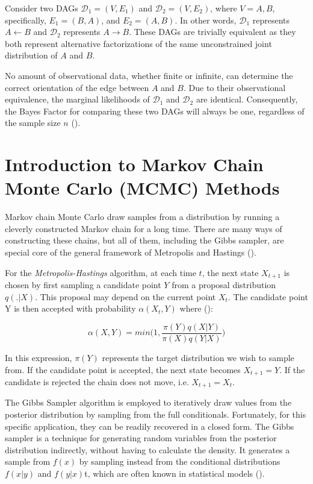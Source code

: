 \documentclass{report}
\begin{document}
Consider two DAGs $\mathcal{D}_1 = (V,E_1)$ and $\mathcal{D}_2 = (V,E_2)$, where $V = {A, B}$, specifically, $E_1 = {(B,A)}$, and $E_2 = {(A,B)}$. In other words, $\mathcal{D}_1$ represents $A \leftarrow B$ and $\mathcal{D}_2$ represents $A \rightarrow B$. These DAGs are trivially equivalent as they both represent alternative factorizations of the same unconstrained joint distribution of $A$ and $B$.

No amount of observational data, whether finite or infinite, can determine the correct orientation of the edge between $A$ and $B$. Due to their observational equivalence, the marginal likelihoods of $\mathcal{D}_1$ and $\mathcal{D}_2$ are identical. Consequently, the Bayes Factor for comparing these two DAGs will always be one, regardless of the sample size $n$ (\citet{peluso2020compatible}).

\section{Introduction to Markov Chain Monte Carlo (MCMC) Methods}

Markov chain Monte Carlo draw samples from a distribution by running a cleverly constructed Markov chain for a long time. There are many ways of constructing these chains, but all of them, including the Gibbs sampler, are special core of the general framework of Metropolis and Hastings (\citet{gilks1995introducing}). 

For the \textit{Metropolis-Hastings} algorithm, at each time $t$, the next state $X_{t+1}$ is chosen by first sampling a candidate point $Y$ from a proposal distribution $q(.|X)$. This proposal may depend on the current point $X_t$. The candidate point Y is then accepted with probability $\alpha(X_t,Y)$ where (\citet{gilks1995markov}):

\begin{equation} \label{ratio}
	\alpha(X,Y)=min \biggl(1, \frac{\pi(Y)q(X|Y)}{\pi(X)q(Y|X)} \biggr )
\end{equation}

In this expression, $\pi(Y)$ represents the target distribution we wish to sample from. If the candidate point is accepted, the next state becomes $X_{t+1}=Y$. If the candidate is rejected the chain does not move, i.e. $X_{t+1}=X_t$. 

The Gibbs Sampler algorithm is employed to iteratively draw values from the posterior distribution by sampling from the full conditionals. Fortunately, for this specific application, they can be readily recovered in a closed form. The Gibbs sampler is a technique for generating random variables from the posterior distribution indirectly, without having to calculate the density. It generates a sample from $f(x)$ by sampling instead from the conditional distributions $f(x|y)$ and $f(y|x)$t, which are often known in statistical models (\citet{casella1992explaining}).
\end{document}

